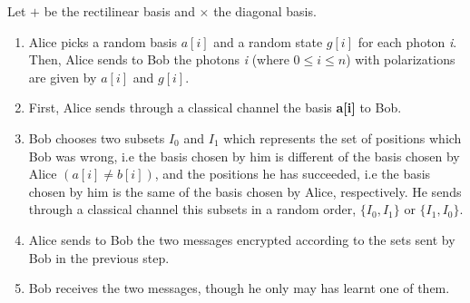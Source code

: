 %

Let $+$ be the rectilinear basis and $\times$ the diagonal basis.%
\begin{enumerate}
    \item{Alice picks a random basis $a[i]$ and a random state $g[i]$ for each photon \textit{i}. Then, Alice sends to Bob the photons \textit{i} (where $0\le i \le n$) with polarizations are given by $a[i]$ and $g[i]$.}
	\item{First, Alice sends through a classical channel the basis \textbf{a[i]} to Bob.}
	\item{Bob chooses two subsets $I_{0}$ and $I_{1}$ which represents the set of positions which Bob was wrong, i.e the basis chosen by him is different of the basis chosen by Alice $(a[i]\neq b[i])$,  and the positions he has succeeded, i.e the basis chosen by him is the same of the basis chosen by Alice, respectively. He sends through a classical channel this subsets in a random order, $\{ I_{0},I_{1} \}$ or $\{ I_{1},I_{0} \}$.}
	\item{Alice sends to Bob the two messages encrypted according to the sets sent by Bob in the previous step.}
	\item{Bob receives the two messages, though he only may has learnt one of them.}
\end{enumerate}

